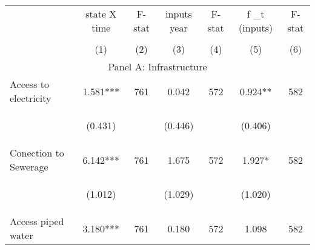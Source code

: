 \begin{tabular}{lcccccc}


\toprule


\multicolumn{1}{l}{} & \multicolumn{1}{c}{state X time} & \multicolumn{1}{c}{F-stat} & \multicolumn{1}{c}{inputs year} & \multicolumn{1}{c}{F-stat} & \multicolumn{1}{c}{f \_t (inputs)} & \multicolumn{1}{c}{F-stat}  \\

\cmidrule(l{1mm}r{1mm}){2-3} \cmidrule(l{1mm}r{1mm}){4-5} \cmidrule(l{1mm}r{1mm}){6-7}   \\

 & (1) & (2) & (3) & (4) & (5) & (6)  \\ 
 

\hline

\multicolumn{7}{c}{Panel A: Infrastructure}   \\                                                          

Access to electricity   &  1.581***   &  761  &   0.042  &  572 &  0.924**  &  582 \\

\vspace{4pt} &  \begin{footnotesize}(0.431)\end{footnotesize}   & &
			    \begin{footnotesize}(0.446)\end{footnotesize}   & &
			    \begin{footnotesize}(0.406)\end{footnotesize}   & 
			     \\          


Conection to Sewerage   &  6.142***   &  761  &   1.675  &  572 &  1.927*  &  582   \\

\vspace{4pt} &  \begin{footnotesize}(1.012)\end{footnotesize}   & &
			    \begin{footnotesize}(1.029)\end{footnotesize}   & &
			    \begin{footnotesize}(1.020)\end{footnotesize}   &
			     \\          


Access piped water   &  3.180***   &  761  &   0.180  &  572 &  1.098  &  582   \\



\end{tabular}

